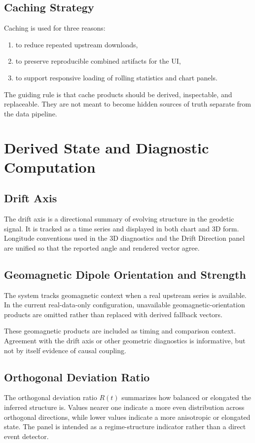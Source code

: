 \documentclass[11pt]{article}
\begin{document}
\subsection{Caching Strategy}
Caching is used for three reasons:
\begin{enumerate}[leftmargin=1.5em]
  \item to reduce repeated upstream downloads,
  \item to preserve reproducible combined artifacts for the UI,
  \item to support responsive loading of rolling statistics and chart panels.
\end{enumerate}

The guiding rule is that cache products should be derived, inspectable, and replaceable. They are not meant to become hidden sources of truth separate from the data pipeline.

\section{Derived State and Diagnostic Computation}
\subsection{Drift Axis}
The drift axis is a directional summary of evolving structure in the geodetic signal. It is tracked as a time series and displayed in both chart and 3D form. Longitude conventions used in the 3D diagnostics and the Drift Direction panel are unified so that the reported angle and rendered vector agree.

\subsection{Geomagnetic Dipole Orientation and Strength}
The system tracks geomagnetic context when a real upstream series is available. In the current real-data-only configuration, unavailable geomagnetic-orientation products are omitted rather than replaced with derived fallback vectors.

These geomagnetic products are included as timing and comparison context. Agreement with the drift axis or other geometric diagnostics is informative, but not by itself evidence of causal coupling.

\subsection{Orthogonal Deviation Ratio}
The orthogonal deviation ratio $R(t)$ summarizes how balanced or elongated the inferred structure is. Values nearer one indicate a more even distribution across orthogonal directions, while lower values indicate a more anisotropic or elongated state. The panel is intended as a regime-structure indicator rather than a direct event detector.
\end{document}
